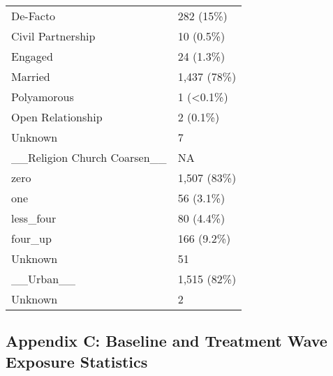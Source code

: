 \documentclass[
  singlecolumn]{article}
\begin{document}
\begin{tabular}[t]{ll}
De-Facto & 282 (15\%)\\
Civil Partnership & 10 (0.5\%)\\
\addlinespace
Engaged & 24 (1.3\%)\\
Married & 1,437 (78\%)\\
Polyamorous & 1 (<0.1\%)\\
Open Relationship & 2 (0.1\%)\\
Unknown & 7\\
\addlinespace
\_\_Religion Church Coarsen\_\_ & NA\\
zero & 1,507 (83\%)\\
one & 56 (3.1\%)\\
less\_four & 80 (4.4\%)\\
four\_up & 166 (9.2\%)\\
\addlinespace
Unknown & 51\\
\_\_Urban\_\_ & 1,515 (82\%)\\
Unknown & 2\\
\bottomrule
\end{tabular}

\newpage{}

\subsection{Appendix C: Baseline and Treatment Wave Exposure
Statistics}\label{appendix-exposures}
\end{document}
